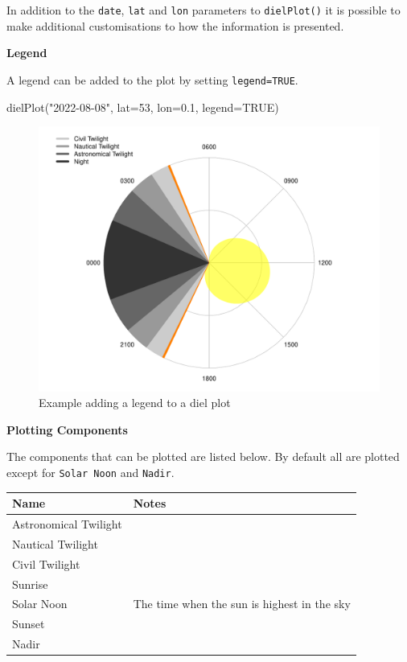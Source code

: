 \documentclass[
]{book}
\newenvironment{Shaded}{\begin{snugshade}}{\end{snugshade}}
\newcommand{\AttributeTok}[1]{\textcolor[rgb]{0.77,0.63,0.00}{#1}}
\newcommand{\ConstantTok}[1]{\textcolor[rgb]{0.00,0.00,0.00}{#1}}
\newcommand{\DecValTok}[1]{\textcolor[rgb]{0.00,0.00,0.81}{#1}}
\newcommand{\FloatTok}[1]{\textcolor[rgb]{0.00,0.00,0.81}{#1}}
\newcommand{\FunctionTok}[1]{\textcolor[rgb]{0.00,0.00,0.00}{#1}}
\newcommand{\NormalTok}[1]{#1}
\newcommand{\StringTok}[1]{\textcolor[rgb]{0.31,0.60,0.02}{#1}}
\begin{document}
In addition to the \texttt{date}, \texttt{lat} and \texttt{lon} parameters to \texttt{dielPlot()} it is possible to make additional customisations to how the information is presented.

\textbf{Legend}

A legend can be added to the plot by setting \texttt{legend=TRUE}.

\begin{Shaded}
\begin{Highlighting}[]
\FunctionTok{dielPlot}\NormalTok{(}\StringTok{"2022{-}08{-}08"}\NormalTok{, }\AttributeTok{lat=}\DecValTok{53}\NormalTok{, }\AttributeTok{lon=}\FloatTok{0.1}\NormalTok{, }\AttributeTok{legend=}\ConstantTok{TRUE}\NormalTok{)}
\end{Highlighting}
\end{Shaded}

\begin{figure}

{\centering \includegraphics[width=0.9\linewidth]{_main_files/figure-latex/diel-plot-legend-1} 

}

\caption{Example adding a legend to a diel plot}\label{fig:diel-plot-legend}
\end{figure}

\textbf{Plotting Components}

The components that can be plotted are listed below. By default all are plotted except for \texttt{Solar\ Noon} and \texttt{Nadir}.

\begin{longtable}[]{@{}ll@{}}
\toprule()
Name & Notes \\
\midrule()
\endhead
Astronomical Twilight & \\
Nautical Twilight & \\
Civil Twilight & \\
Sunrise & \\
Solar Noon & The time when the sun is highest in the sky \\
Sunset & \\
Nadir & \\
\bottomrule()
\end{longtable}
\end{document}
